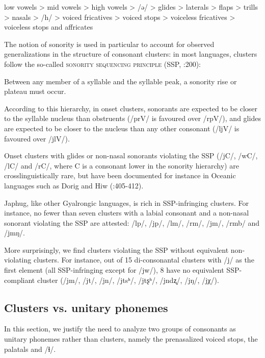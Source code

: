 \documentclass[12pt]{article}
\newcommand{\ipa}[1]{\mbox{\phon/#1/}}
\renewcommand{\footnote}[1]{\endnote{\normalsize#1}}
\begin{document}
\begin{myexe}  
\ex    
\glt low vowels > mid vowels > high vowels > \ipa{ə} > glides > laterals > flaps
> trills > nasals > \ipa{h} > voiced fricatives > voiced stops > voiceless
fricatives > voiceless stops and affricates
\end{myexe}
The notion of sonority is used in particular to account for observed generalizations in the structure of consonant clusters: in most languages, clusters follow the so-called \textsc{sonority sequencing principle} (SSP, \citealt{blevins95syllable}:200):

\begin{myexe}
\ex \label{ex:ssp}
\glt Between any member of a syllable and the syllable peak, a sonority
rise or plateau must occur.
\end{myexe}
According to this hierarchy, in onset clusters, sonorants are expected to be closer to the syllable nucleus than obstruents (\ipa{prV} is favoured over \ipa{rpV}), and glides are expected to be closer to the nucleus than any other consonant (\ipa{ljV} is favoured over \ipa{jlV}).

Onset clusters with glides or non-nasal sonorants violating the SSP (\ipa{jC}, \ipa{wC}, \ipa{lC} and \ipa{rC}, where C is a consonant lower in the sonority hierarchy) are crosslinguistically rare, but have been documented for instance in Oceanic languages such as Dorig and Hiw (\citealt{francois10gl}:405-412). 

Japhug, like other Gyalrongic languages,\footnote{See e.g. \citet{jackson00puxi} and Lai (\citeyear{lai13affixale}:25--29).} is rich in SSP-infringing  clusters. For instance, no fewer than seven clusters with a labial consonant and a non-nasal sonorant violating the SSP are attested:  \ipa{lp}, \ipa{jp}, \ipa{lm}, \ipa{rm}, \ipa{jm}, \ipa{rmb} and \ipa{jmŋ}. 

More surprisingly, we find clusters violating the SSP without equivalent non-violating clusters. For instance, out of 15 di-consonantal clusters with \ipa{j} as the first element (all SSP-infringing  except for \ipa{jw}), 8 have no equivalent SSP-compliant cluster (\ipa{jm}, \ipa{jt}, \ipa{jn}, \ipa{jtsʰ}, \ipa{jtʂʰ}, \ipa{jndʐ}, \ipa{jŋ}, \ipa{jχ}).

\subsection*{Clusters vs. unitary phonemes} \label{sec:non.clusters}
In this section, we justify the need to analyze two groups of consonants as unitary phonemes rather than clusters, namely the prenasalized voiced stops, the palatals and \ipa{ɬ}.
 
\end{document}
